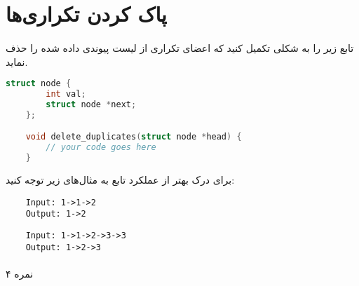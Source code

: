 \documentclass[../main.tex]{subfiles}
\begin{document}
\section{پاک کردن تکراری‌ها}
\paragraph{}
تابع زیر را به شکلی تکمیل کنید که اعضای تکراری از لیست پیوندی داده شده را حذف نماید.

\begin{latin}
\begin{lstlisting}[language=c]
    struct node {
        int val;
        struct node *next;
    };

    void delete_duplicates(struct node *head) {
        // your code goes here
    }
\end{lstlisting}
\end{latin}

برای درک بهتر از عملکرد تابع به مثال‌های زیر توجه کنید:

\begin{latin}
\begin{verbatim}
    Input: 1->1->2
    Output: 1->2
\end{verbatim}

\begin{verbatim}
    Input: 1->1->2->3->3
    Output: 1->2->3
\end{verbatim}
\end{latin}

\paragraph{}
۴ نمره
\end{document}
